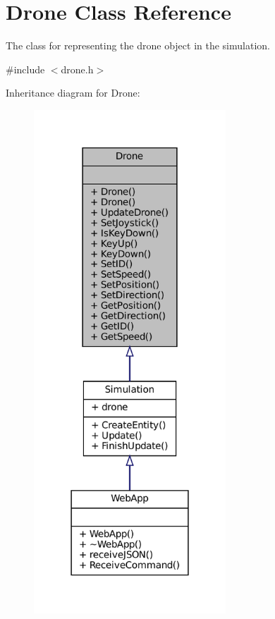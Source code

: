 \hypertarget{classDrone}{}\section{Drone Class Reference}
\label{classDrone}


The class for representing the drone object in the simulation.  




{\ttfamily \#include $<$drone.\+h$>$}



Inheritance diagram for Drone\+:\nopagebreak
\begin{figure}[H]
\begin{center}
\leavevmode
\includegraphics[width=204pt]{classDrone__inherit__graph}
\end{center}
\end{figure}


